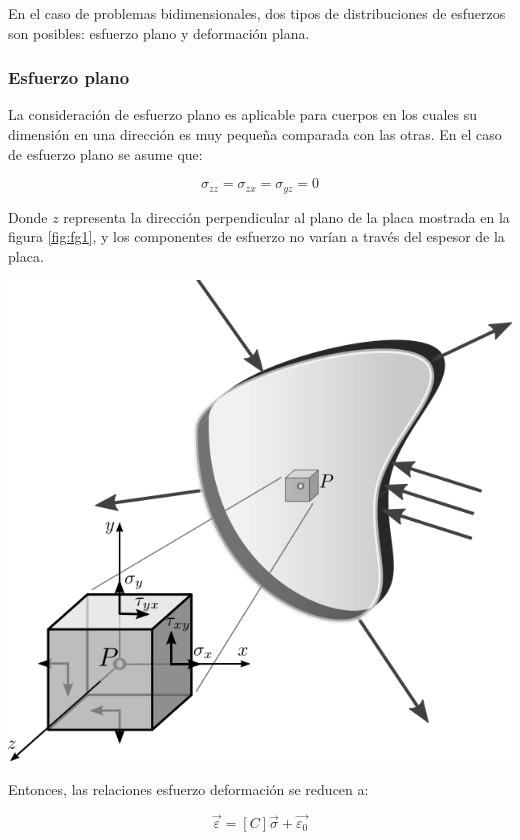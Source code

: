En el caso de problemas bidimensionales, dos tipos de distribuciones de esfuerzos son posibles: esfuerzo plano 
y deformación plana.

\subsubsection{Esfuerzo plano}

La consideración de esfuerzo plano es aplicable para cuerpos en los cuales su dimensión en una dirección es muy 
pequeña comparada con las otras. En el caso de esfuerzo plano se asume que:

\begin{equation}
\sigma_{zz} = \sigma_{zx} = \sigma_{yz} = 0
\end{equation}

Donde $z$ representa la dirección perpendicular al plano de la placa mostrada en la figura \ref{fig:fg1}, 
y los componentes de esfuerzo no varían a través del espesor de la placa.

\begin{center}
\includegraphics[scale=0.35]{src/ch2/plane_stress.png}
\label{fig:fg1}
\end{center}

Entonces, las relaciones esfuerzo deformación se reducen a:

\begin{equation}
\vec{\varepsilon} = [C] \vec{\sigma} + \vec{\varepsilon_0}
\end{equation}

